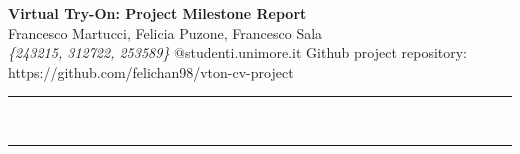 \documentclass[a4paper,12pt]{article}
\renewenvironment{abstract}
 {\par\noindent\textbf{\abstractname}\ \ignorespaces \\}
 {\par\noindent\medskip}
\begin{document}
\pagestyle{fancy}
\thispagestyle{empty}
\fancyhead[L]{}

\renewcommand*{\thefootnote}{\fnsymbol{footnote}}

\begin{center}
\Large{\textbf{Virtual Try-On: Project Milestone Report}} 
\vspace{0.4cm}
\normalsize
\\ Francesco Martucci, Felicia Puzone, Francesco Sala \\
\vspace{0.1cm}
\textit{\{243215, 312722, 253589\}}
\small{@studenti.unimore.it}
Github project repository: https://github.com/felichan98/vton-cv-project\\
\medskip
\normalsize
\end{center}

{\color{gray}\hrule}
\vspace{0.4cm}
\begin{abstract}

\end{abstract}

{\color{gray}\hrule}
\medskip






\end{document}
